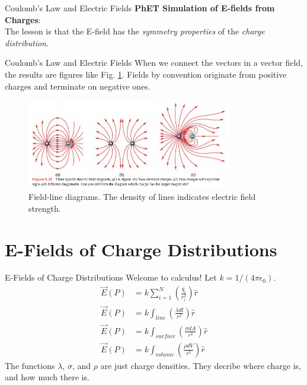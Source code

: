 \documentclass{beamer}
\begin{document}
\begin{frame}{Coulomb’s Law and Electric Fields}
\small
\textbf{PhET Simulation of E-fields from Charges}: \\ \vspace{0.5cm}
\alert{The lesson is that the E-field has the \textit{symmetry properties} of the \textit{charge distribution}}.
\end{frame}

\begin{frame}{Coulomb’s Law and Electric Fields}
When we connect the vectors in a vector field, the results are figures like Fig. \ref{fig:lines}.  Fields by convention originate from positive charges and terminate on negative ones.
\begin{figure}
\includegraphics[width=0.8\textwidth]{figures/lines.png}
\caption{\label{fig:lines} Field-line diagrams.  The density of lines indicates electric field strength.}
\end{figure}
\end{frame}

\section{E-Fields of Charge Distributions}

\begin{frame}{E-Fields of Charge Distributions}
Welcome to calculus! Let $k = 1/(4\pi\epsilon_0)$.
\begin{align}
\vec{E}(P) &= k \sum_{i = 1}^N \left(\frac{q_i}{r_i^2}\right) \hat{r} \label{eq:point} \\
\vec{E}(P) &= k \int_{line} \left(\frac{\lambda dl}{r^2}\right) \hat{r} \label{eq:line} \\
\vec{E}(P) &= k \int_{surface} \left(\frac{\sigma dA}{r^2}\right) \hat{r} \label{eq:surface} \\
\vec{E}(P) &= k \int_{volume} \left(\frac{\rho dV}{r^2}\right) \hat{r} \label{eq:volume}
\end{align}
The functions $\lambda$, $\sigma$, and $\rho$ are just charge densities.  They decribe where charge is, and how much there is.  
\end{frame}
\end{document}
